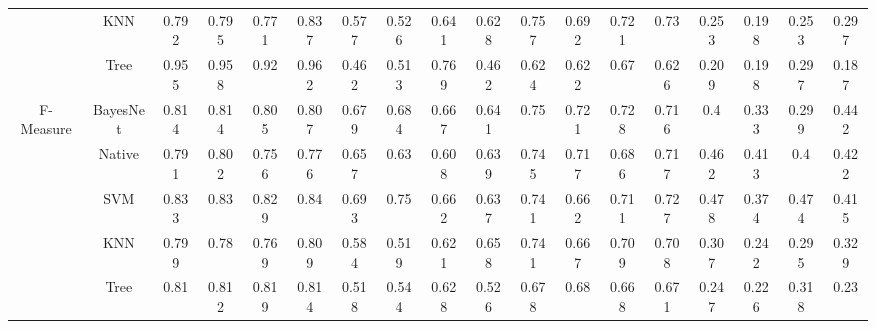 {{\begin{table*}[htbp]
\begin{tabular}{cccccccccccccccccc}
&KNN&	0.792	&0.795	&0.771	&0.837		&0.577	&0.526	&0.641	&0.628		&0.757	&0.692	&0.721	&0.73	&	0.253	&0.198	&0.253	&0.297\\
&Tree&	0.955	&0.958	&0.92&	0.962		&0.462	&0.513	&0.769&	0.462&		0.624&	0.622&	0.67&	0.626&		0.209&	0.198&	0.297&	0.187\\
\hline
\multirow{5}{*}{F-Measure}
&BayesNet&0.814&	0.814	&0.805&	0.807	&	0.679&	0.684	&0.667	&0.641	&	0.75	&0.721&	0.728	&0.716	&	0.4	&0.333&	0.299	&0.442\\
&Native&0.791&	0.802&	0.756&	0.776		&0.657	&0.63&	0.608	&0.639	&	0.745	&0.717	&0.686	&0.717	&	0.462&	0.413	&0.4	&0.422\\
&SVM&	0.833	&0.83&	0.829&	0.84&		0.693&	0.75&	0.662&	0.637&		0.741&	0.662&	0.711&	0.727&		0.478&	0.374&	0.474	&0.415\\
&KNN&	0.799	&0.78	&0.769&	0.809&		0.584	&0.519	&0.621	&0.658	&	0.741	&0.667	&0.709	&0.708	&	0.307	&0.242	&0.295	&0.329\\
&Tree&	0.81	&0.812	&0.819&	0.814&		0.518&	0.544&	0.628&	0.526&		0.678&	0.68&	0.668	&0.671&		0.247&	0.226&	0.318&	0.23\\
\bottomrule[1.5pt]
\end{tabular}
\end{table*}

}}

